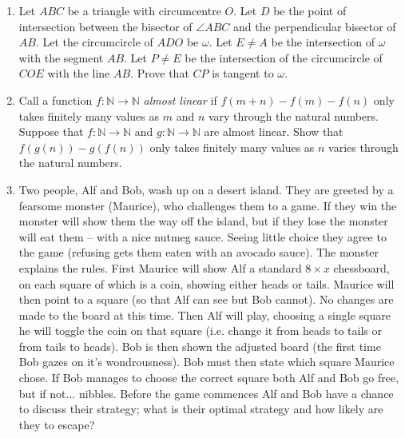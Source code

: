 \documentclass{article}
\begin{document}
\begin{enumerate}[1.]
\vspace{6pt}
\item %
Let $ABC$ be a triangle with circumcentre $O$. Let $D$ be the point of intersection between the bisector of $\angle ABC$ and the perpendicular bisector of $AB$. Let the circumcircle of $ADO$ be $\omega$. Let $E\neq A$ be the intersection of $\omega$ with the segment $AB$. Let $P\neq E$ be the intersection of the circumcircle of $COE$ with the line $AB$. Prove that $CP$ is tangent to $\omega$.


\vspace{6pt}
\item %
Call a function $f : \mathbb{N} \to \mathbb{N}$ \emph{almost linear} if $f(m + n) - f(m) - f(n)$ only takes finitely many values as $m$ and $n$ vary through the natural numbers. Suppose that $f : \mathbb{N} \to \mathbb{N}$ and $g : \mathbb{N} \to \mathbb{N}$ are almost linear. Show that $f(g(n)) - g(f(n))$ only takes finitely many values as $n$ varies through the natural numbers.


\vspace{6pt}
\item %
Two people, Alf and Bob, wash up on a desert island. They are greeted by a fearsome monster (Maurice), who challenges them to a game. If they win the monster will show them the way off the island, but if they lose the monster will eat them -- with a nice nutmeg sauce. Seeing little choice they agree to the game (refusing gets them eaten with an avocado sauce). The monster explains the rules. First Maurice will show Alf a standard $8 \times x$ chessboard, on each square of which is a coin, showing either heads or tails. Maurice will then point to a square (so that Alf can see but Bob cannot). No changes are made to the board at this time. Then Alf will play, choosing a single square he will toggle the coin on that square (i.e. change it from heads to tails or from tails to heads). Bob is then shown the adjusted board (the first time Bob gazes on it's wondrousness). Bob must then state which square Maurice chose. If Bob manages to choose the correct square both Alf and Bob go free, but if not... nibbles. Before the game commences Alf and Bob have a chance to discuss their strategy; what is their optimal strategy and how likely are they to escape?


\end{enumerate}
\end{document}

